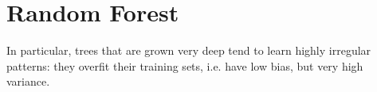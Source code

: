 \section{Random Forest}

In particular, trees that are grown very deep tend to learn highly irregular patterns: they overfit their training sets, i.e. have low bias, but very high variance.
\cite{noauthor_random_2023}
